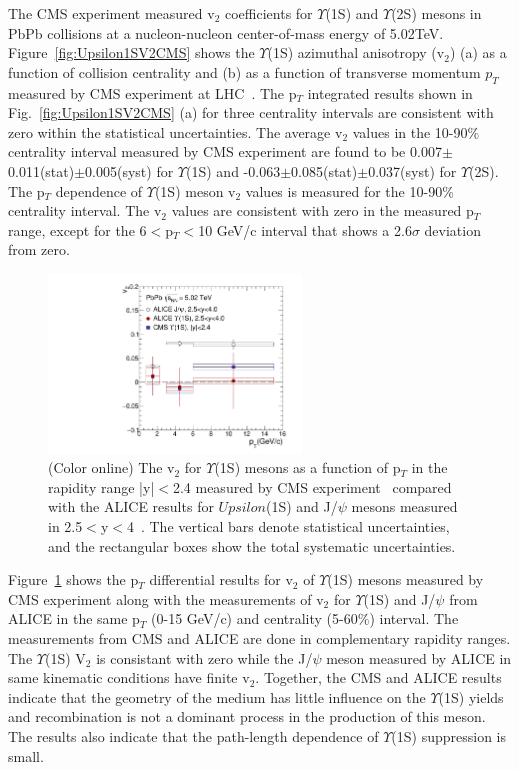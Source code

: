 The CMS experiment measured v$_{2}$ coefficients for $\Upsilon$(1S) and $\Upsilon$(2S) mesons in PbPb collisions
at a nucleon-nucleon center-of-mass energy of 5.02TeV. Figure~\ref{fig:Upsilon1SV2CMS} shows the $\Upsilon$(1S) azimuthal
anisotropy (v$_{2}$) (a) as a function of collision centrality and (b) as a function of transverse momentum $p_{T}$ measured
by CMS experiment at LHC~\cite{CMS:2020efs}. The p$_{T}$ integrated results
shown in Fig.~\ref{fig:Upsilon1SV2CMS} (a) for three centrality intervals are consistent with zero within the statistical
uncertainties. The average v$_{2}$ values in the 10-90$\%$ centrality interval measured by CMS experiment are found to
be 0.007$\pm$0.011(stat)$\pm$0.005(syst) for $\Upsilon$(1S) and -0.063$\pm$0.085(stat)$\pm$0.037(syst) for $\Upsilon$(2S).   
The p$_{T}$ dependence of $\Upsilon$(1S) meson v$_{2}$ values is measured for the 10-90$\%$ centrality interval.
The v$_{2}$ values are consistent with zero in the measured p$_T$ range, except for the 6$<$p$_{T}<$10 GeV/c interval that
shows a 2.6$\sigma$ deviation from zero. 

\begin{figure}
  \begin{center}
\includegraphics[width=0.6\textwidth]{Figures/ExpOverview/Fig_CMS_ALICE_Y1S_5TeV_V2.pdf}
\caption{(Color online) The v$_{2}$ for $\Upsilon$(1S) mesons as a function of p$_{T}$ in the rapidity range |y|$<$2.4 measured by
  CMS experiment~\cite{CMS:2020efs} compared with the ALICE results for $Upsilon$(1S) and J/$\psi$ mesons measured
  in 2.5$<$y$<$4~\cite{ALICE:2019pox}. The vertical bars denote statistical uncertainties,
  and the rectangular boxes show the total systematic uncertainties.
}
\label{fig:Upsilon1SV2Compare}
\end{center}
\end{figure}

Figure~\ref{fig:Upsilon1SV2Compare} shows the p$_{T}$ differential results for v$_{2}$ of $\Upsilon$(1S)
mesons measured by CMS experiment along with the measurements of v$_{2}$ for $\Upsilon$(1S) and J/$\psi$
from ALICE in the same p$_{T}$ (0-15 GeV/c) and centrality (5-60$\%$) interval. The measurements from CMS
and ALICE are done in complementary rapidity ranges. The $\Upsilon$(1S) V$_{2}$ is consistant with zero while
the J/$\psi$ meson measured by ALICE in same kinematic conditions have finite v$_{2}$. Together, the CMS and ALICE
results indicate that the geometry of the medium has little influence on the $\Upsilon$(1S) yields and recombination is
not a dominant process in the production of this meson. The results also indicate that the path-length dependence of
$\Upsilon$(1S) suppression is small.



